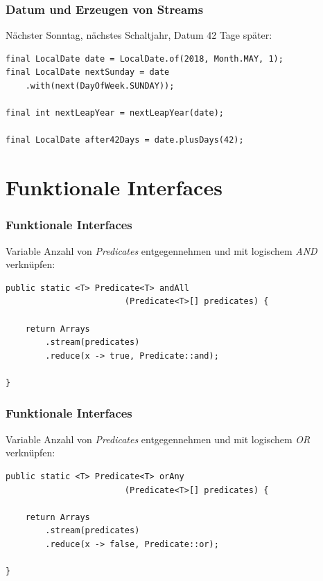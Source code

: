 \documentclass{beamer}
\begin{document}
\begin{frame}[fragile]
\frametitle{Datum und Erzeugen von Streams}

N\"achster Sonntag, n\"achstes Schaltjahr, Datum 42 Tage sp\"ater:

\begin{lstlisting}
final LocalDate date = LocalDate.of(2018, Month.MAY, 1);
final LocalDate nextSunday = date
    .with(next(DayOfWeek.SUNDAY));

final int nextLeapYear = nextLeapYear(date);

final LocalDate after42Days = date.plusDays(42);
\end{lstlisting}

\end{frame}


\section{Funktionale Interfaces}
\begin{frame}[fragile]
\frametitle{Funktionale Interfaces}

Variable Anzahl von \textit{Predicates} entgegennehmen und mit logischem \textit{AND} verkn\"upfen:

\begin{lstlisting}
public static <T> Predicate<T> andAll
                        (Predicate<T>[] predicates) {

    return Arrays
        .stream(predicates)
        .reduce(x -> true, Predicate::and);

}
\end{lstlisting}

\end{frame}

\begin{frame}[fragile]
\frametitle{Funktionale Interfaces}

Variable Anzahl von \textit{Predicates} entgegennehmen und mit logischem \textit{OR} verkn\"upfen:

\begin{lstlisting}
public static <T> Predicate<T> orAny
                        (Predicate<T>[] predicates) {

    return Arrays
        .stream(predicates)
        .reduce(x -> false, Predicate::or);

}
\end{lstlisting}

\end{frame}
\end{document}
